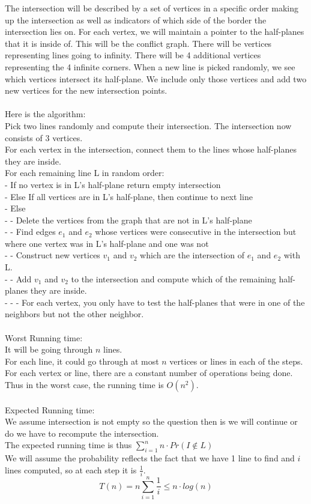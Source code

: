 \documentclass[11pt,psfig]{article}
\begin{document}
The intersection will be described by a set of vertices in a specific order making up the intersection as well as indicators of which side of the border the intersection lies on. For each vertex, we will maintain a pointer to the half-planes that it is inside of. This will be the conflict graph. There will be vertices representing lines going to infinity. There will be 4 additional vertices representing the 4 infinite corners. When a new line is picked randomly, we see which vertices intersect its half-plane. We include only those vertices and add two new vertices for the new intersection points. \\
\\
Here is the algorithm:\\
Pick two lines randomly and compute their intersection. The intersection now consists of 3 vertices. \\
For each vertex in the intersection, connect them to the lines whose half-planes they are inside. \\
For each remaining line L in random order:\\
- If no vertex is in L's half-plane return empty intersection\\
- Else If all vertices are in L's half-plane, then continue to next line\\
- Else \\
- - Delete the vertices from the graph that are not in L's half-plane\\
- - Find edges $e_1$ and $e_2$ whose vertices were consecutive in the intersection but where one vertex was in L's half-plane and one was not\\
- - Construct new vertices $v_1$ and $v_2$ which are the intersection of $e_1$ and $e_2$ with L. \\
- - Add $v_1$ and $v_2$ to the intersection and compute which of the remaining half-planes they are inside. \\
- - - For each vertex, you only have to test the half-planes that were in one of the neighbors but not the other neighbor. \\
\\
Worst Running time:\\
It will be going through $n$ lines. \\
For each line, it could go through at most $n$ vertices or lines in each of the steps. \\
For each vertex or line, there are a constant number of operations being done. \\
Thus in the worst case, the running time is $O(n^2)$. \\
\\
Expected Running time:\\
We assume intersection is not empty so the question then is we will continue or do we have to recompute the intersection. \\
The expected running time is thus $\sum_{i=1}^n n \cdot Pr(I \notin L)$\\
We will assume the probability reflects the fact that we have 1 line to find and $i$ lines computed, so at each step it is $\frac{1}{i}$. \\
\[
T(n) = n \sum_{i=1}^n \frac{1}{i} \leq n \cdot log(n)
\]
\end{document}
